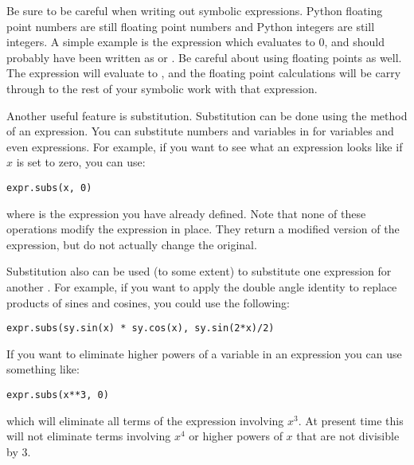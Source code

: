 Be sure to be careful when writing out symbolic expressions.
Python floating point numbers are still floating point numbers and Python integers are still integers.
A simple example is the expression  which evaluates to 0, and should probably have been written as  or .
Be careful about using floating points as well.
The expression  will evaluate to , and the floating point calculations will be carry through to the rest of your symbolic work with that expression.

Another useful feature is substitution.
Substitution can be done using the  method of an expression.
You can substitute numbers and variables in for variables and even expressions.
For example, if you want to see what an expression looks like if $x$ is set to zero, you can use:
\begin{lstlisting}
expr.subs(x, 0)
\end{lstlisting}
where  is the expression you have already defined.
Note that none of these operations modify the expression in place.
They return a modified version of the expression, but do not actually change the original.

Substitution also can be used (to some extent) to substitute one expression for another .
For example, if you want to apply the double angle identity to replace products of sines and cosines, you could use the following:
\begin{lstlisting}
expr.subs(sy.sin(x) * sy.cos(x), sy.sin(2*x)/2)
\end{lstlisting}
If you want to eliminate higher powers of a variable in an expression you can use something like:
\begin{lstlisting}
expr.subs(x**3, 0)
\end{lstlisting}
which will eliminate all terms of the expression involving $x^3$.
At present time this will not eliminate terms involving $x^4$ or higher powers of $x$ that are not divisible by 3.

